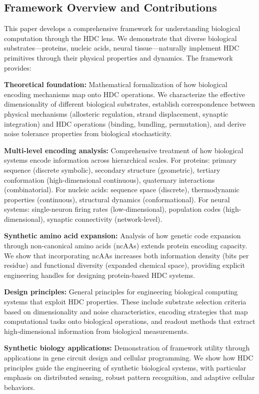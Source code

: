 \documentclass[12pt]{article}
\begin{document}
\subsection{Framework Overview and Contributions}

This paper develops a comprehensive framework for understanding biological computation through the HDC lens. We demonstrate that diverse biological substrates—proteins, nucleic acids, neural tissue—naturally implement HDC primitives through their physical properties and dynamics. The framework provides:

\textbf{Theoretical foundation:} Mathematical formalization of how biological encoding mechanisms map onto HDC operations. We characterize the effective dimensionality of different biological substrates, establish correspondence between physical mechanisms (allosteric regulation, strand displacement, synaptic integration) and HDC operations (binding, bundling, permutation), and derive noise tolerance properties from biological stochasticity.

\textbf{Multi-level encoding analysis:} Comprehensive treatment of how biological systems encode information across hierarchical scales. For proteins: primary sequence (discrete symbolic), secondary structure (geometric), tertiary conformation (high-dimensional continuous), quaternary interactions (combinatorial). For nucleic acids: sequence space (discrete), thermodynamic properties (continuous), structural dynamics (conformational). For neural systems: single-neuron firing rates (low-dimensional), population codes (high-dimensional), synaptic connectivity (network-level).

\textbf{Synthetic amino acid expansion:} Analysis of how genetic code expansion through non-canonical amino acids (ncAAs) extends protein encoding capacity. We show that incorporating ncAAs increases both information density (bits per residue) and functional diversity (expanded chemical space), providing explicit engineering handles for designing protein-based HDC systems.

\textbf{Design principles:} General principles for engineering biological computing systems that exploit HDC properties. These include substrate selection criteria based on dimensionality and noise characteristics, encoding strategies that map computational tasks onto biological operations, and readout methods that extract high-dimensional information from biological measurements.

\textbf{Synthetic biology applications:} Demonstration of framework utility through applications in gene circuit design and cellular programming. We show how HDC principles guide the engineering of synthetic biological systems, with particular emphasis on distributed sensing, robust pattern recognition, and adaptive cellular behaviors.
\end{document}
